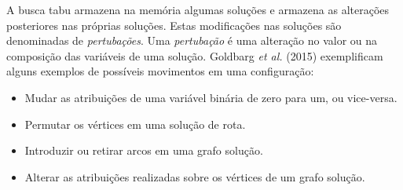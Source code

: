 A busca tabu armazena na memória algumas soluções e armazena as alterações posteriores nas próprias soluções. Estas modificações nas soluções são denominadas de \emph{pertubações}. Uma \emph{pertubação} é uma alteração no valor ou na composição das variáveis de uma solução. Goldbarg \emph{et al.} (2015) exemplificam alguns exemplos de possíveis movimentos em uma configuração:

\begin{itemize}
    \item Mudar as atribuições de uma variável binária de zero para um, ou vice-versa.
    \item Permutar os vértices em uma solução de rota.
    \item Introduzir ou retirar arcos em uma grafo solução.
    \item Alterar as atribuições realizadas sobre os vértices de um grafo solução.
\end{itemize}


